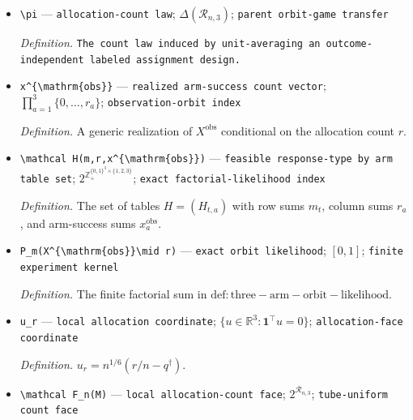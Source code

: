 \documentclass{article}
\begin{document}
\begin{itemize}
  \par\smallskip\noindent\emph{Definition.} \texttt{An index for a sign cell,\allowbreak{} a fixed compact partition-\allowbreak{}of-\allowbreak{}unity patch,\allowbreak{} and a fixed zero-\allowbreak{}coordinate or support stratum in the common finite-\allowbreak{}lattice atlas.}
  \item \texttt{\textbackslash{}\allowbreak{}pi} --- \texttt{allocation-\allowbreak{}count law}; \(\Delta(\mathcal R_{n,3})\); \texttt{parent orbit-\allowbreak{}game transfer}
  \par\smallskip\noindent\emph{Definition.} \texttt{The count law induced by unit-\allowbreak{}averaging an outcome-\allowbreak{}independent labeled assignment design.}
  \item \texttt{x\textasciicircum{}\{\textbackslash{}\allowbreak{}mathrm\{obs\}\allowbreak{}\}\allowbreak{}} --- \texttt{realized arm-\allowbreak{}success count vector}; \(\prod_{a=1}^3\{0,\ldots,r_a\}\); \texttt{observation-\allowbreak{}orbit index}
  \par\smallskip\noindent\emph{Definition.} A generic realization of \(X^{\mathrm{obs}}\) conditional on the allocation count \(r\).
  \item \texttt{\textbackslash{}\allowbreak{}mathcal H(m,\allowbreak{}r,\allowbreak{}x\textasciicircum{}\{\textbackslash{}\allowbreak{}mathrm\{obs\}\allowbreak{}\}\allowbreak{})} --- \texttt{feasible response-\allowbreak{}type by arm table set}; \(2^{\mathbb Z_+^{\{0,1\}^3\times\{1,2,3\}}}\); \texttt{exact factorial-\allowbreak{}likelihood index}
  \par\smallskip\noindent\emph{Definition.} The set of tables \(H=(H_{t,a})\) with row sums \(m_t\), column sums \(r_a\), and arm-success sums \(x_a^{\mathrm{obs}}\).
  \item \texttt{P\_\allowbreak{}m(X\textasciicircum{}\{\textbackslash{}\allowbreak{}mathrm\{obs\}\allowbreak{}\}\allowbreak{}\textbackslash{}\allowbreak{}mid r)} --- \texttt{exact orbit likelihood}; \([0,1]\); \texttt{finite experiment kernel}
  \par\smallskip\noindent\emph{Definition.} The finite factorial sum in \(\mathrm{def:three-arm-orbit-likelihood}\).
  \item \texttt{u\_\allowbreak{}r} --- \texttt{local allocation coordinate}; \(\{u\in\mathbb R^3:\mathbf 1^\top u=0\}\); \texttt{allocation-\allowbreak{}face coordinate}
  \par\smallskip\noindent\emph{Definition.} \(u_r=n^{1/6}(r/n-q^\dagger)\).
  \item \texttt{\textbackslash{}\allowbreak{}mathcal F\_\allowbreak{}n(M)} --- \texttt{local allocation-\allowbreak{}count face}; \(2^{\mathcal R_{n,3}}\); \texttt{tube-\allowbreak{}uniform count face}

\end{itemize}
\end{document}
